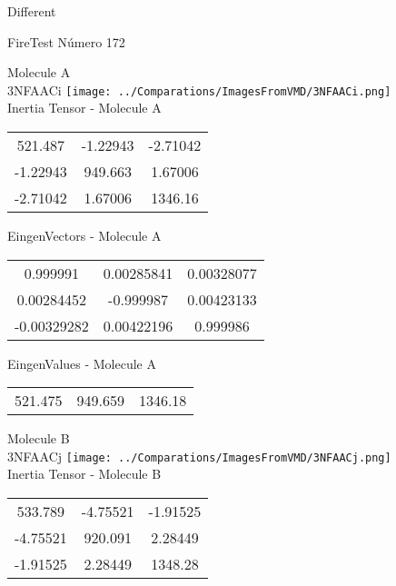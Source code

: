 \begin{center}
\vtab
\vtab
\textcolor{NavyBlue}{\Large Different}
\end{center}

 \newpage

\vtab[-2cm]
\begin{center}
{\large FireTest \tab Número 172}
\end{center}
\begin{multicols}{2}
\begin{center}

Molecule A \\ 
3NFAACi
\texttt{[image: ../Comparations/ImagesFromVMD/3NFAACi.png]}
\\
Inertia Tensor - Molecule A \\
\vtab

\begin{tabular}{|c c c|}
521.487	 & 	-1.22943	 & 	-2.71042	 \\
-1.22943	 & 	949.663	 & 	1.67006	 \\
-2.71042	 & 	1.67006	 & 	1346.16
\end{tabular}

\vtab
 EingenVectors - Molecule A     \\
\vtab
\begin{tabular}{|c c c|}
0.999991	 & 	0.00285841	 & 	0.00328077	 \\
0.00284452	 & 	-0.999987	 & 	0.00423133	 \\
-0.00329282	 & 	0.00422196	 & 	0.999986
\end{tabular}

\vtab
 EingenValues - Molecule A     \\
\vtab
\begin{tabular}{|c c c|}
521.475	 & 	949.659	 & 	1346.18	 \\
\end{tabular}
\columnbreak

Molecule B \\ 
3NFAACj
\texttt{[image: ../Comparations/ImagesFromVMD/3NFAACj.png]}
\\
Inertia Tensor - Molecule B \\
\vtab

\begin{tabular}{|c c c|}
533.789	 & 	-4.75521	 & 	-1.91525	 \\
-4.75521	 & 	920.091	 & 	2.28449	 \\
-1.91525	 & 	2.28449	 & 	1348.28
\end{tabular}


\end{center}
\end{multicols}
